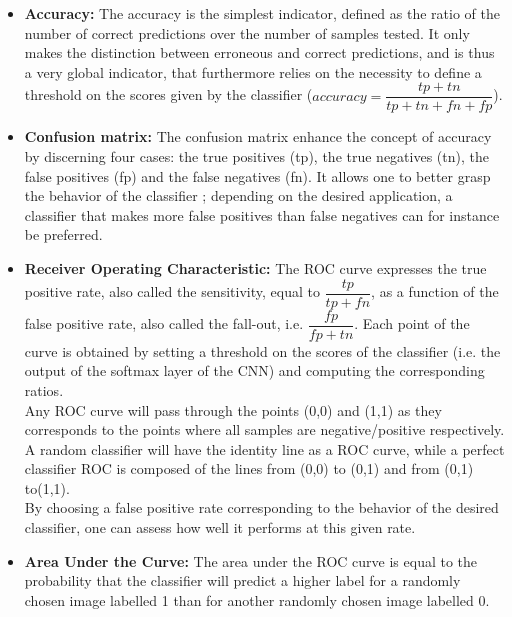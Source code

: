 \documentclass[a4paper]{article}
\begin{document}
        \begin{itemize}
        	\item \textbf{Accuracy:} The accuracy is the simplest indicator, defined as the ratio of the number of correct predictions over the number of samples tested. It only makes the distinction between erroneous and correct predictions, and is thus a very global indicator, that furthermore relies on the necessity to define a threshold on the scores given by the classifier ($accuracy = \dfrac{tp + tn}{tp + tn + fn + fp}$).
        	\item \textbf{Confusion matrix:} The confusion matrix enhance the concept of accuracy by discerning four cases: the true positives (tp), the true negatives (tn), the false positives (fp) and the false negatives (fn). It allows one to better grasp the behavior of the classifier ; depending on the desired application, a classifier that makes more false positives than false negatives can for instance be preferred.
        	\item \textbf{Receiver Operating Characteristic:} The ROC curve expresses the true positive rate, also called the sensitivity, equal to $\dfrac{tp}{tp+fn}$, as a function of the false positive rate, also called the fall-out, i.e. $\dfrac{fp}{fp+tn}$. Each point of the curve is obtained by setting a threshold on the scores of the classifier (i.e. the output of the softmax layer of the CNN) and computing the corresponding ratios.\\
        		Any ROC curve will pass through the points (0,0) and (1,1) as they corresponds to the points where all samples are negative/positive respectively. A random classifier will have the identity line as a ROC curve, while a perfect classifier ROC is composed of the lines from (0,0) to (0,1) and from (0,1) to(1,1).\\
        		By choosing a false positive rate corresponding to the behavior of the desired classifier, one can assess how well it performs at this given rate. 
        	\item \textbf{Area Under the Curve:} The area under the ROC curve is equal to the probability that the classifier will predict a higher label for a randomly chosen image labelled 1 than for another randomly chosen image labelled 0. 

\end{itemize}
\end{document}
